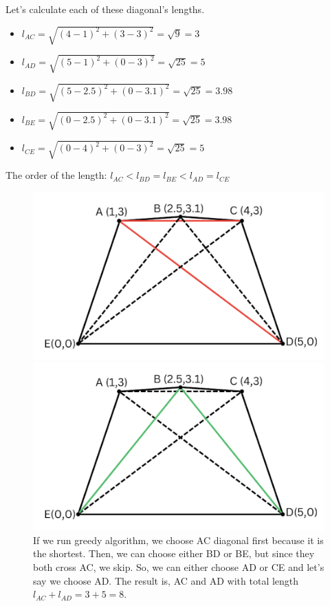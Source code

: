\documentclass{article}
\begin{document}
\begin{enumerate}
  Let's calculate each of these diagonal's lengths.

  \begin{itemize}
    \item $l_{AC}=\sqrt{(4-1)^2+(3-3)^2}=\sqrt{9}=3$
    \item $l_{AD}=\sqrt{(5-1)^2+(0-3)^2}=\sqrt{25}=5$
    \item $l_{BD}=\sqrt{(5-2.5)^2+(0-3.1)^2}=\sqrt{25}=3.98$
    \item $l_{BE}=\sqrt{(0-2.5)^2+(0-3.1)^2}=\sqrt{25}=3.98$
    \item $l_{CE}=\sqrt{(0-4)^2+(0-3)^2}=\sqrt{25}=5$
  \end{itemize}

  The order of the length: $l_{AC}<l_{BD}=l_{BE}<l_{AD}=l_{CE}$

  \begin{figure}[H]
    \centering
    \begin{minipage}{0.4\textwidth}
      \centering
      \includegraphics[width=\textwidth]{image3.png}
      \caption{If we run greedy algorithm, we choose AC diagonal first because it is the shortest.
      Then, we can choose either BD or BE, but since they both cross AC, we skip.
      So, we can either choose AD or CE and let's say we choose AD.
      The result is, AC and AD with total length $l_{AC}+l_{AD}=3+5=8$.}
    \end{minipage}
    \hspace{1cm}
    \begin{minipage}{0.4\textwidth}
      \centering
      \includegraphics[width=\textwidth]{image4.png}

\end{minipage}
\end{figure}
\end{enumerate}
\end{document}
